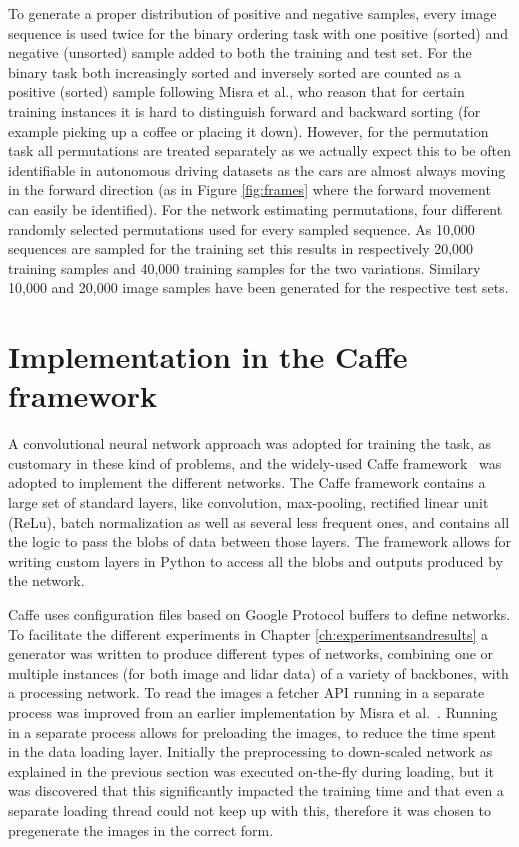 To generate a proper distribution of positive and negative samples, every image sequence is used twice for the binary ordering task with one positive (sorted) and negative (unsorted) sample added to both the training and test set. For the binary task both increasingly sorted and inversely sorted are counted as a positive (sorted) sample following Misra et al.\cite{misra2016}, who reason that for certain training instances it is hard to distinguish forward and backward sorting (for example picking up a coffee or placing it down). However, for the permutation task all permutations are treated separately as we actually expect this to be often identifiable in autonomous driving datasets as the cars are almost always moving in the forward direction (as in Figure \ref{fig:frames} where the forward movement can easily be identified). For the network estimating permutations, four different randomly selected permutations used for every sampled sequence. As 10,000 sequences are sampled for the training set this results in respectively 20,000 training samples and 40,000 training samples for the two variations. Similary 10,000 and 20,000 image samples have been generated for the respective test sets. 

\section{Implementation in the Caffe framework}
A convolutional neural network approach was adopted for training the task, as customary in these kind of problems, and the widely-used Caffe framework~\cite{jia2014} was adopted to implement the different networks. The Caffe framework contains a large set of standard layers, like convolution, max-pooling, rectified linear unit (ReLu), batch normalization as well as several less frequent ones, and contains all the logic to pass the blobs of data between those layers. The framework allows for writing custom layers in Python to access all the blobs and outputs produced by the network.

Caffe uses configuration files based on Google Protocol buffers to define networks. To facilitate the different experiments in Chapter \ref{ch:experimentsandresults} a generator was written to produce different types of networks, combining one or multiple instances (for both image and lidar data) of a variety of backbones, with a processing network. To read the images a fetcher API running in a separate process was improved from an earlier implementation by Misra et al.~\cite{misra2016}. Running in a separate process allows for preloading the images, to reduce the time spent in the data loading layer. Initially the preprocessing to down-scaled network as explained in the previous section was executed on-the-fly during loading, but it was discovered that this significantly impacted the training time and that even a separate loading thread could not keep up with this, therefore it was chosen to pregenerate the images in the correct form.

